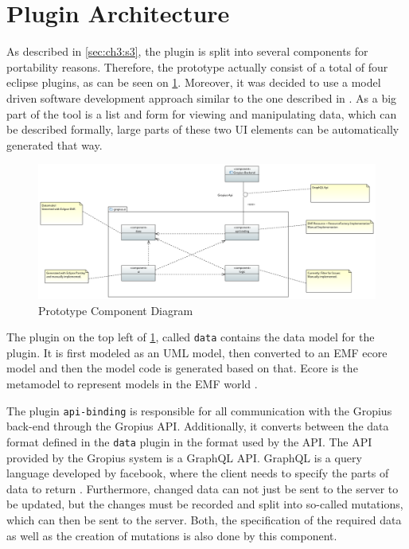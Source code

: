 \section{Plugin Architecture}
\label{sec:ch4:s3}
As described in \cref{sec:ch3:s3}, the plugin is split into several components for portability reasons.
Therefore, the prototype actually consist of a total of four eclipse plugins, as can be seen on \cref{fig:c4:component_diagram}.
Moreover, it was decided to use a model driven software development approach similar to the one described in \cite{beydeda2005model}.
As a big part of the tool is a list and form for viewing and manipulating data, which can be described formally,
large parts of these two \gls{UI} elements can be automatically generated that way.

\begin{figure}[!h]
	\centering
	\includegraphics[width=\textwidth]{graphics/Component_Diagram.png}
	\caption{Prototype Component Diagram}
	\label{fig:c4:component_diagram}
\end{figure}

The plugin on the top left of \cref{fig:c4:component_diagram}, called \lstinline|data| contains the data model for the plugin. 
It is first modeled as an \gls{UML} model, then converted to an \gls{EMF} ecore model and then the model code is generated based on that.
Ecore is the metamodel to represent models in the \gls{EMF} world \cite{steinberg2008emf}.

The plugin \lstinline|api-binding| is responsible for all communication with the Gropius back-end through the Gropius \gls{API}.
Additionally, it converts between the data format defined in the \lstinline|data| plugin in the format used by the \gls{API}.
The \gls{API} provided by the Gropius system is a GraphQL \gls{API}.
GraphQL is a query language developed by facebook, where the client needs to specify the parts of data to return \cite{grpahql2018}.
Furthermore, changed data can not just be sent to the server to be updated, but the changes must be recorded and split into so-called mutations,
which can then be sent to the server.
Both, the specification of the required data as well as the creation of mutations is also done by this component.

